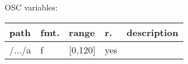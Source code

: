 \begin{snugshade}
{\footnotesize
\label{osctab:tascarapnoise}
OSC variables:
\nopagebreak

\begin{tabularx}{\textwidth}{llllX}
\hline
path & fmt. & range & r. & description\\
\hline
/.../a & f & [0,120] & yes & \\
\hline
\end{tabularx}
}
\end{snugshade}
